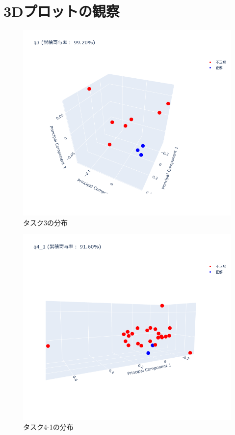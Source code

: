 \documentclass[paper=a4paper,fontsize=11pt]{jlreq}
\begin{document}
  \section{3Dプロットの観察}
    \begin{figure}[htbp]
      \centering
      \includegraphics[width=0.8\linewidth]{3dplot_q3.png}
      \caption{タスク3の分布}
    \end{figure}
    \FloatBarrier
    \begin{figure}[htbp]
      \centering
      \includegraphics[width=0.8\linewidth]{3dplot_q4_1.png}
      \caption{タスク4-1の分布}
    \end{figure}
    \FloatBarrier
\end{document}
